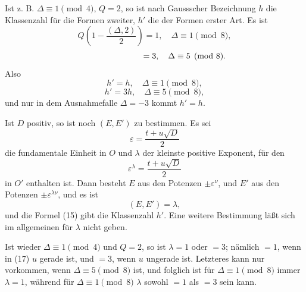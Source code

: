 \documentclass[11pt]{article}
\begin{document}
Ist z. B. \(\Delta\equiv1\pmod4\), \(Q=2\), so ist nach Gaussscher Bezeichnung \(h\) die Klassenzahl für die Formen zweiter, \(h'\) die der Formen erster Art. Es ist
\[
 Q\left(1-\frac{(\Delta,2)}{2}\right)=1,\quad \Delta\equiv1\pmod8,
\]
\[
 \hphantom{Q\left(1-\frac{(\Delta,2)}{2}\right)}=3,\quad \Delta\equiv5\pmod8.
\]
Also
\[
 h'=h,\quad \Delta\equiv1\pmod8,
\]
\[
 h'=3h,\quad \Delta\equiv5\pmod8,
\]
und nur in dem Ausnahmefalle \(\Delta=-3\) kommt \(h'=h\).

Ist \(D\) positiv, so ist noch \((E,E')\) zu bestimmen. Es sei
\[
 \varepsilon=\frac{t+u\sqrt D}{2}
\]
die fundamentale Einheit in \(O\) und \(\lambda\) der kleinste positive Exponent, für den
\[
 \varepsilon^\lambda=\frac{t+u\sqrt D}{2}
\]
in \(O'\) enthalten ist. Dann besteht \(E\) aus den Potenzen \(\pm\varepsilon^\nu\), und \(E'\) aus den Potenzen \(\pm\varepsilon^{\lambda\nu}\), und es ist
\[
 (E,E')=\lambda,
\]
und die Formel (15) gibt die Klassenzahl \(h'\). Eine weitere Bestimmung läßt sich im allgemeinen für \(\lambda\) nicht geben.

Ist wieder \(\Delta\equiv1\pmod4\) und \(Q=2\), so ist \(\lambda=1\) oder \(=3\); nämlich \(=1\), wenn in (17) \(u\) gerade ist, und \(=3\), wenn \(u\) ungerade ist. Letzteres kann nur vorkommen, wenn \(\Delta\equiv5\pmod8\) ist, und folglich ist für \(\Delta\equiv1\pmod8\) immer \(\lambda=1\), während für \(\Delta\equiv1\pmod8\) \(\lambda\) sowohl \(=1\) als \(=3\) sein kann.
\end{document}
